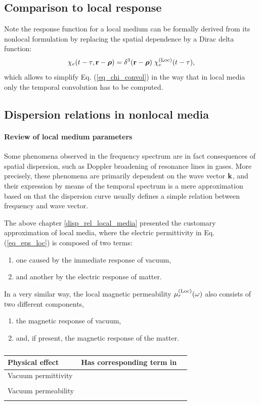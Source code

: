 \subsection{Comparison to local response} 
Note the response function for a local medium can be formally derived from its nonlocal formulation by replacing the spatial dependence by a Dirac delta function: %
\begin{equation} \chi_e(t-\tau, {\mathbf{r}}-\boldsymbol{\rho}) = \delta^{3}({\mathbf{r}}-\boldsymbol{\rho}) \; \chi_e^{\rm(Loc)}(t-\tau), \label{eq_loc_chi}\end{equation}
which allows to simplify Eq. (\ref{eq_chi_convol}) in the way that in local media only the temporal convolution has to be computed.

\subsection{Dispersion relations in nonlocal media} %
\paragraph{Review of local medium parameters}%
Some phenomena observed in the frequency spectrum are in fact consequences of spatial dispersion, such as Doppler broadening of resonance lines in gases.\cite[p. 359]{landau1984electrodynamics} More precisely, these phenomena are primarily dependent on the wave vector ${\mathbf{k}}$, and their expression by means of the temporal spectrum is a mere approximation based on that the dispersion curve usually defines a simple relation between  frequency and wave vector. 

The above chapter \ref{disp_rel_local_media} presented the customary approximation of local media, where the electric permittivity in Eq. (\ref{eq_eps_loc}) is composed of two terms: 
\begin{enumerate}
 \item{one caused  by the immediate response of vacuum,} 
 \item{and another by the electric response of matter.}
 \end{enumerate}
In a very similar way, the local magnetic permeability $\mu^{\rm(Loc)}_r(\omega)$ also consists of two different components, 
\begin{enumerate}[resume]
 \item{the magnetic response of vacuum,} 
 \item{and, if present, the magnetic response of the matter.} 
\end{enumerate}
\begin{table}[ht]   \caption{}  \label{tb_} \centering 
\begin{tabular}{lcr}
 \toprule
Physical effect & Has corresponding term in \\
 \hline
Vacuum permittivity &	&	\\
 &	&	\\
Vacuum permeability &	&	\\
 &	&	\\
 \bottomrule
 \end{tabular} \end{table}


